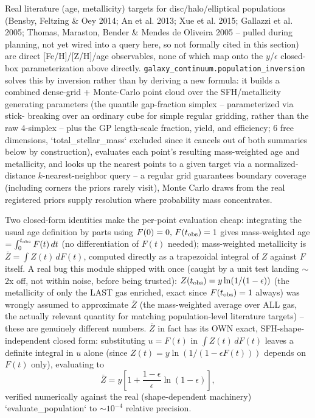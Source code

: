 \documentclass{aastex7}
\begin{document}
Real literature (age, metallicity) targets for disc/halo/elliptical
populations (Bensby, Feltzing \& Oey 2014; An et al. 2013; Xue et al. 2015;
Gallazzi et al. 2005; Thomas, Maraston, Bender \& Mendes de Oliveira 2005 --
pulled during planning, not yet wired into a query here, so not formally
cited in this section) are direct [Fe/H]/[Z/H]/age observables, none of
which map onto the $y$/$\epsilon$ closed-box parameterization above
directly. \texttt{galaxy\_continuum.population\_inversion} solves this by
inversion rather than by deriving a new formula: it builds a combined
dense-grid + Monte-Carlo point cloud over the SFH/metallicity generating
parameters (the quantile gap-fraction simplex -- parameterized via stick-
breaking over an ordinary cube for simple regular gridding, rather than the
raw 4-simplex -- plus the GP length-scale fraction, yield, and efficiency;
$6$ free dimensions, `total\_stellar\_mass` excluded since it cancels out of
both summaries below by construction), evaluates each point's resulting
mass-weighted age and metallicity, and looks up the nearest points to a
given target via a normalized-distance $k$-nearest-neighbor query -- a
regular grid guarantees boundary coverage (including corners the priors
rarely visit), Monte Carlo draws from the real registered priors supply
resolution where probability mass concentrates.

Two closed-form identities make the per-point evaluation cheap: integrating
the usual age definition by parts using $F(0)=0,\,F(t_{\rm obs})=1$ gives
mass-weighted age $= \int_0^{t_{\rm obs}} F(t)\,dt$ (no differentiation of
$F(t)$ needed); mass-weighted metallicity is
$\bar{Z} = \int Z(t)\,dF(t)$, computed directly as a trapezoidal integral
of $Z$ against $F$ itself. A real bug this module shipped with once (caught
by a unit test landing $\sim$2x off, not within noise, before being trusted):
$Z(t_{\rm obs}) = y\ln(1/(1-\epsilon))$ (the metallicity of only the LAST
gas enriched, exact since $F(t_{\rm obs})=1$ always) was wrongly assumed to
approximate $\bar{Z}$ (the mass-weighted average over ALL gas, the actually
relevant quantity for matching population-level literature targets) --
these are genuinely different numbers. $\bar{Z}$ in fact has its OWN exact,
SFH-shape-independent closed form: substituting $u=F(t)$ in
$\int Z(t)\,dF(t)$ leaves a definite integral in $u$ alone (since
$Z(t)=y\ln(1/(1-\epsilon F(t)))$ depends on $F(t)$ only), evaluating to
\begin{equation}
    \bar{Z} = y \left[1 + \frac{1-\epsilon}{\epsilon}\ln(1-\epsilon)\right],
\end{equation}
verified numerically against the real (shape-dependent machinery)
`evaluate\_population` to $\sim 10^{-4}$ relative precision.
\end{document}
